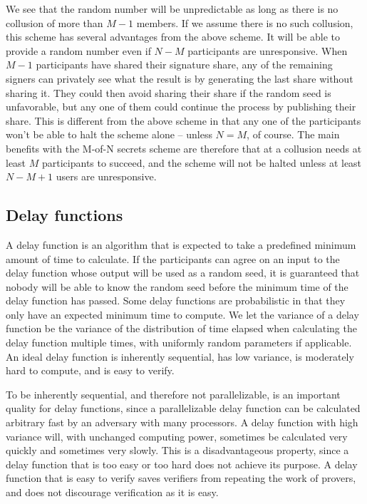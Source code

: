 We see that the random number will be unpredictable as long as there is no collusion of more than $M-1$ members. If we assume there is no such collusion, this scheme has several advantages from the above scheme. It will be able to provide a random number even if $N-M$ participants are unresponsive. When $M-1$ participants have shared their signature share, any of the remaining signers can privately see what the result is by generating the last share without sharing it. They could then avoid sharing their share if the random seed is unfavorable, but any one of them could continue the process by publishing their share. This is different from the above scheme in that any one of the participants won't be able to halt the scheme alone – unless $N=M$, of course. The main benefits with the M-of-N secrets scheme are therefore that at a collusion needs at least $M$ participants to succeed, and the scheme will not be halted unless at least $N - M + 1$ users are unresponsive.

\subsection{Delay functions}
A delay function is an algorithm that is expected to take a predefined minimum amount of time to calculate. If the participants can agree on an input to the delay function whose output will be used as a random seed, it is guaranteed that nobody will be able to know the random seed before the minimum time of the delay function has passed. Some delay functions are probabilistic in that they only have an expected minimum time to compute. We let the variance of a delay function be the variance of the distribution of time elapsed when calculating the delay function multiple times, with uniformly random parameters if applicable. An ideal delay function is inherently sequential, has low variance, is moderately hard to compute, and is easy to verify.

To be inherently sequential, and therefore not parallelizable, is an important quality for delay functions, since a parallelizable delay function can be calculated arbitrary fast by an adversary with many processors. A delay function with high variance will, with unchanged computing power, sometimes be calculated very quickly and sometimes very slowly. This is a disadvantageous property, since a delay function that is too easy or too hard does not achieve its purpose. A delay function that is easy to verify saves verifiers from repeating the work of provers, and does not discourage verification as it is easy.

